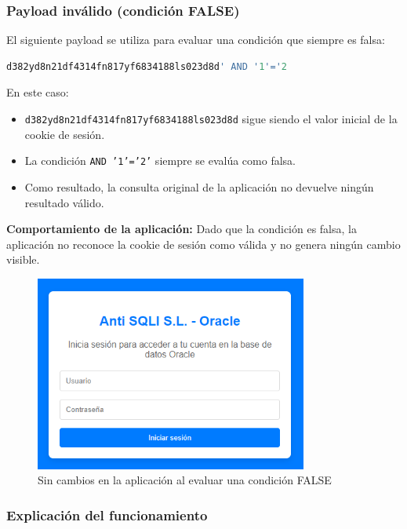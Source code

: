 \documentclass[a4paper,12pt]{article}
\begin{document}
\subsubsection{Payload inválido (condición FALSE)}

El siguiente payload se utiliza para evaluar una condición que siempre es falsa:

\begin{lstlisting}[language=SQL]
d382yd8n21df4314fn817yf6834188ls023d8d' AND '1'='2
\end{lstlisting}

En este caso:
\begin{itemize}
    \item \texttt{d382yd8n21df4314fn817yf6834188ls023d8d} sigue siendo el valor inicial de la cookie de sesión.
    \item La condición \texttt{AND '1'='2'} siempre se evalúa como falsa.
    \item Como resultado, la consulta original de la aplicación no devuelve ningún resultado válido.
\end{itemize}

\textbf{Comportamiento de la aplicación:} Dado que la condición es falsa, la aplicación no reconoce la cookie de sesión como válida y no genera ningún cambio visible.

\begin{figure}[H]
    \centering
    \includegraphics[width=0.8\textwidth]{Imagenes/blind5.png}
    \caption{Sin cambios en la aplicación al evaluar una condición FALSE}
\end{figure}

\subsubsection{Explicación del funcionamiento}
\end{document}
